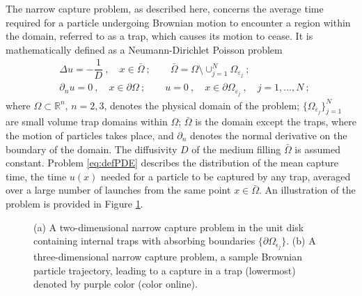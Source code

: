 \documentclass[11pt,letter,subeqn,fleqn]{article}
\newcommand{\subDom}{\bar{\Omega}}
\newcommand{\veps}{\varepsilon}     %
\begin{document}
The narrow capture problem, as described here, concerns the average time required for a particle undergoing Brownian motion to encounter a region within the domain, referred to as a trap, which causes its motion to cease. It is mathematically defined as a Neumann-Dirichlet Poisson problem
\begin{equation} \label{eq:defPDE}
\begin{split}
& \Delta u = -\dfrac{1}{D} \ , \quad x \in \subDom \ ; \qquad
\subDom = \Omega \setminus \mathop{\cup}_{j = 1}^{N} \Omega_{\veps_j} \ ; \\[5pt]
& \partial_n u = 0 \ , \quad x \in \partial\Omega \ ; \qquad
u = 0 \ , \quad x \in \partial\Omega_{\veps_j} \ , \quad j = 1, \ldots , N \ ;
\end{split}
\end{equation}
where $\Omega\subset \mathbb{R}^n$, $n=2,3$, denotes the physical domain of the problem; $\{\Omega_{\veps_j}\}_{j = 1}^{N}$ are small volume trap domains within $\Omega$; $\subDom$ is the domain except the traps, where the motion of particles takes place, and $\partial_n$ denotes the normal derivative on the boundary of the domain. The diffusivity $D$ of the medium filling $\subDom$ is assumed constant. Problem  \eqref{eq:defPDE} describes the distribution of the mean capture time, the time $u(x)$ needed for a  particle to be captured by any trap, averaged over a large number of launches from the same point $x\in \subDom$. An illustration of the problem is provided in Figure \ref{fig:ProblemSchematic}.

\begin{figure}[H]
\centering
{}
\hspace{5ex}
\caption{ (a) A two-dimensional narrow capture problem in the unit disk containing internal traps with absorbing boundaries $\{\partial\Omega_{\epsilon_j}\}$. (b) A three-dimensional narrow capture problem, a sample Brownian particle trajectory, leading to a capture in a trap (lowermost) denoted by purple color (color online).}
\label{fig:ProblemSchematic}
\end{figure}
\end{document}
